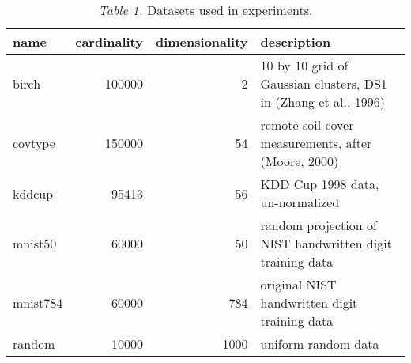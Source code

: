 \begin{table}
  \footnotesize\centering
  \begin{tabular}{|l|r|r|l|} \hline
    name & cardinality & dimensionality & description \\ \hline
    birch & 100000 & 2 & 10 by 10 grid of Gaussian clusters, DS1 in (Zhang et al., 1996) \\ \hline
    covtype & 150000 & 54 & remote soil cover measurements, after (Moore, 2000) \\ \hline
    kddcup & 95413 & 56 & KDD Cup 1998 data, un-normalized \\ \hline
    mnist50 & 60000 & 50 & random projection of NIST handwritten digit training data \\ \hline
    mnist784 & 60000 & 784 & original NIST handwritten digit training data \\ \hline
    random & 10000 & 1000 & uniform random data \\ \hline
  \end{tabular}
  \caption*{\footnotesize \textit{Table 1.} Datasets used in experiments.}
  
  \vspace{2em}
  

\end{table}
